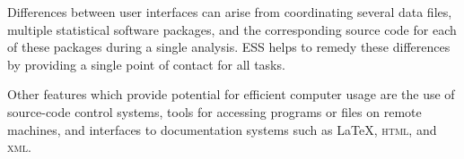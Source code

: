 \documentclass{article}
\newcommand{\stexttt}[1]{{\small\texttt{#1}}}
\begin{document}
Differences between user interfaces can arise from coordinating
several data files, multiple statistical software packages, and the
corresponding source code for each of these packages during a single
analysis.  ESS helps to remedy these differences by providing a single
point of contact for all tasks.  

Other features which
provide potential for efficient
computer usage are the use of source-code control
systems, tools for accessing programs or files on remote machines, and
interfaces to documentation systems such as \LaTeX,
\textsc{html}, and \textsc{xml}.  





\end{document}
